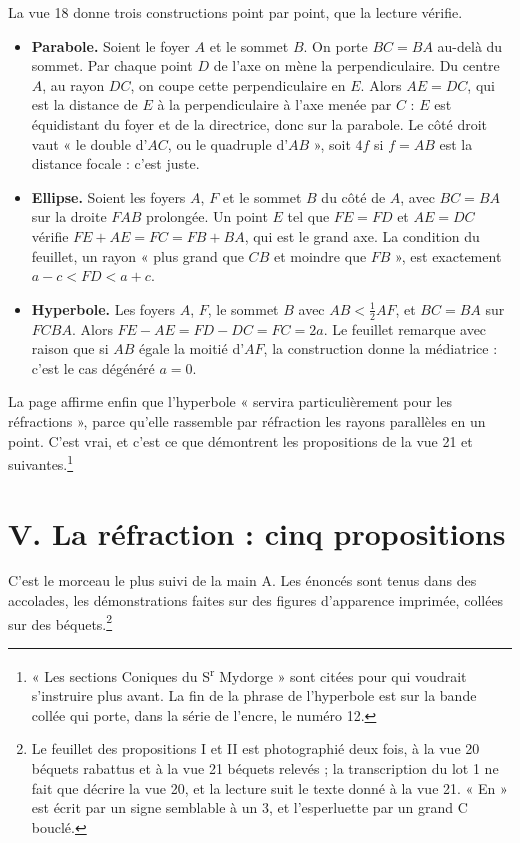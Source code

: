 \documentclass[11pt,a4paper]{article}
\begin{document}
La vue 18 donne trois constructions point par point, que la lecture vérifie.
\begin{itemize}
  \item \textbf{Parabole.} Soient le foyer \(A\) et le sommet \(B\). On porte
    \(BC=BA\) au-delà du sommet. Par chaque point \(D\) de l'axe on mène la
    perpendiculaire. Du centre \(A\), au rayon \(DC\), on coupe cette
    perpendiculaire en \(E\). Alors \(AE=DC\), qui est la distance de \(E\) à la
    perpendiculaire à l'axe menée par \(C\) : \(E\) est équidistant du foyer et
    de la directrice, donc sur la parabole. Le côté droit vaut « le double
    d'\(AC\), ou le quadruple d'\(AB\) », soit \(4f\) si \(f=AB\) est la
    distance focale : c'est juste.
  \item \textbf{Ellipse.} Soient les foyers \(A\), \(F\) et le sommet \(B\) du
    côté de \(A\), avec \(BC=BA\) sur la droite \(FAB\) prolongée. Un point \(E\)
    tel que \(FE=FD\) et \(AE=DC\) vérifie \(FE+AE=FC=FB+BA\), qui est le grand
    axe. La condition du feuillet, un rayon « plus grand que \(CB\) et moindre
    que \(FB\) », est exactement \(a-c<FD<a+c\).
  \item \textbf{Hyperbole.} Les foyers \(A\), \(F\), le sommet \(B\) avec
    \(AB<\frac12AF\), et \(BC=BA\) sur \(FCBA\). Alors \(FE-AE=FD-DC=FC=2a\).
    Le feuillet remarque avec raison que si \(AB\) égale la moitié d'\(AF\), la
    construction donne la médiatrice : c'est le cas dégénéré \(a=0\).
\end{itemize}
La page affirme enfin que l'hyperbole « servira particulièrement pour les
réfractions », parce qu'elle rassemble par réfraction les rayons parallèles en
un point. C'est vrai, et c'est ce que démontrent les propositions de la vue 21
et suivantes.\footnote{« Les sections Coniques du S\textsuperscript{r}
Mydorge » sont citées pour qui voudrait s'instruire plus avant. La fin de la
phrase de l'hyperbole est sur la bande collée qui porte, dans la série de
l'encre, le numéro 12.}

\section*{V. La réfraction : cinq propositions}

C'est le morceau le plus suivi de la main A. Les énoncés sont tenus dans des
accolades, les démonstrations faites sur des figures d'apparence imprimée,
collées sur des béquets.\footnote{Le feuillet des propositions I et II est
photographié deux fois, à la vue 20 béquets rabattus et à la vue 21 béquets
relevés ; la transcription du lot 1 ne fait que décrire la vue 20, et la
lecture suit le texte donné à la vue 21. « En » est écrit par un signe
semblable à un 3, et l'esperluette par un grand C bouclé.}
\end{document}
